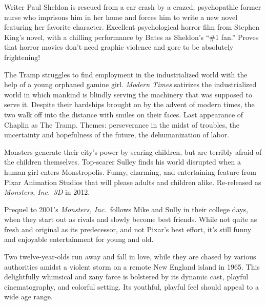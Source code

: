    Writer Paul Sheldon is rescued from a car crash by a crazed; psychopathic former nurse who imprisons him in her home and forces him to write a new novel featuring her favorite character. Excellent psychological horror film from Stephen King's novel, with a chilling performance by Bates as Sheldon's ``\#1 fan.'' Proves that horror movies don't need graphic violence and gore to be absolutely frightening! \author{DW} 

   The Tramp struggles to find employment in the industrialized world with the help of a young orphaned gamine girl. \textit{Modern Times} satirizes the industrialized world in which mankind is blindly serving the machinery that was supposed to serve it. Despite their hardships brought on by the advent of modern times, the two walk off into the distance with smiles on their faces. Last appearance of Chaplin as The Tramp. Themes: perseverance in the midst of troubles, the uncertainty and hopefulness of the future, the dehumanization of labor. \author{AW} 

   Monsters generate their city's power by scaring children, but are terribly afraid of the children themselves. Top-scarer Sulley finds his world disrupted when a human girl enters Monstropolis. Funny, charming, and entertaining feature from Pixar Animation Studios that will please adults and children alike. Re-released as \textit{Monsters, Inc.\ 3D} in 2012. \author{DW} 

   Prequel to 2001's \textit{Monsters, Inc.}\ follows Mike and Sully in their college days, when they start out as rivals and slowly become best friends. While not quite as fresh and original as its predecessor, and not Pixar's best effort, it's still funny and enjoyable entertainment for young and old. \author{DW} 

   Two twelve-year-olds run away and fall in love, while they are chased by various authorities amidst a violent storm on a remote New England island in 1965. This delightfully whimsical and zany farce is bolstered by its dynamic cast, playful cinematography, and colorful setting. Its youthful, playful feel should appeal to a wide age range. \author{DW} 

